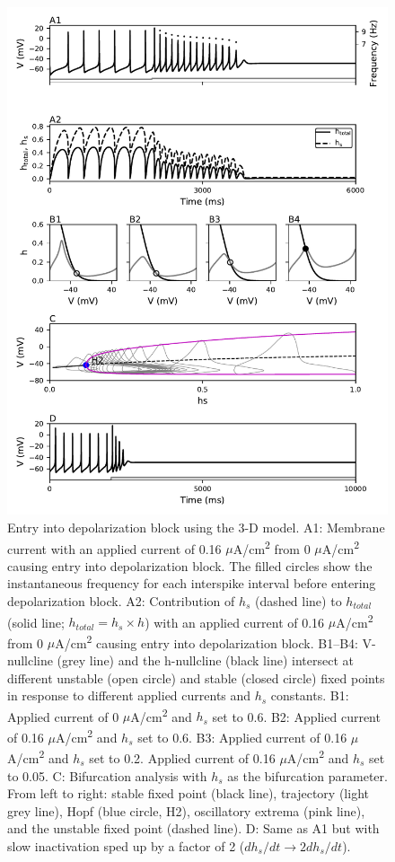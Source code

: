 \begin{figure}
	\centering
	\includegraphics[scale=0.7]{../figures/figure_3.pdf}
	\caption{Entry into depolarization block using the 3-D model. A1: Membrane current with an applied current of 0.16 $\mu$A/cm\textsuperscript{2} from 0 $\mu$A/cm\textsuperscript{2} causing entry into depolarization block. The filled circles show the instantaneous frequency for each interspike interval before entering depolarization block. A2: Contribution of $h_s$ (dashed line) to $h_{total}$ (solid line; $h_{total}= h_{s} \times h$) with an applied current of 0.16 $\mu$A/cm\textsuperscript{2} from 0 $\mu$A/cm\textsuperscript{2} causing entry into depolarization block. B1--B4: V-nullcline (grey line) and the h-nullcline (black line) intersect at different unstable (open circle) and stable (closed circle) fixed points in response to different applied currents and $h_s$ constants. B1: Applied current of 0 $\mu$A/cm\textsuperscript{2} and $h_s$ set to 0.6. B2: Applied current of 0.16 $\mu$A/cm\textsuperscript{2} and $h_s$ set to 0.6. B3: Applied current of 0.16 $\mu$A/cm\textsuperscript{2} and $h_s$ set to 0.2. Applied current of 0.16 $\mu$A/cm\textsuperscript{2} and $h_s$ set to 0.05. C: Bifurcation analysis with $h_s$ as the bifurcation parameter. From left to right: stable fixed point (black line), trajectory (light grey line), Hopf (blue circle, H2), oscillatory extrema (pink line), and the unstable fixed point (dashed line). D: Same as A1 but with slow inactivation sped up by a factor of 2 ($dh_s/dt \rightarrow 2dh_s/dt$).}
	\label{fig:3}
\end{figure}

